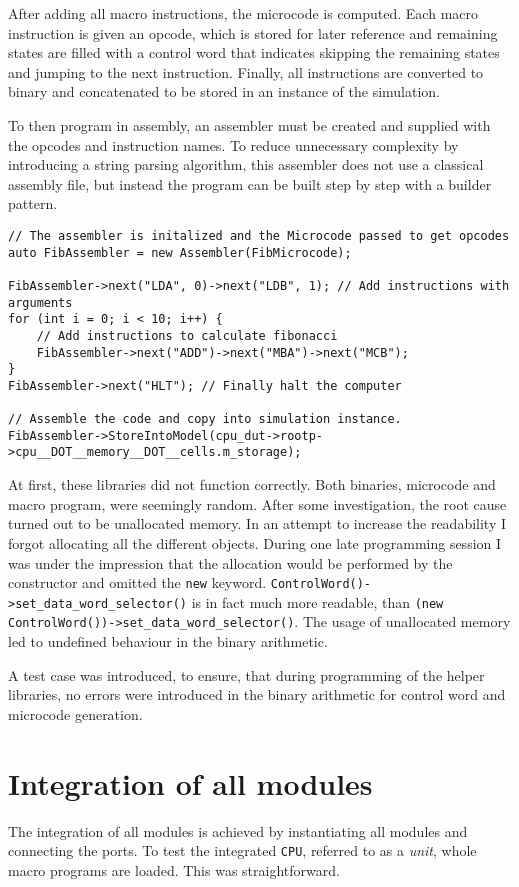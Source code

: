 After adding all macro instructions, the microcode is computed. Each macro instruction is given an opcode, which is stored for later reference and remaining states are filled with a control word that indicates skipping the remaining states and jumping to the next instruction. Finally, all instructions are converted to binary and concatenated to be stored in an instance of the simulation. 

To then program in assembly, an assembler must be created and supplied with the opcodes and instruction names. To reduce unnecessary complexity by introducing a string parsing algorithm, this assembler does not use a classical assembly file, but instead the program can be built step by step with a builder pattern. 

\begin{lstlisting}[caption=Inialization of Assembler and programming of macrocode ]
// The assembler is initalized and the Microcode passed to get opcodes
auto FibAssembler = new Assembler(FibMicrocode); 

FibAssembler->next("LDA", 0)->next("LDB", 1); // Add instructions with arguments
for (int i = 0; i < 10; i++) {
    // Add instructions to calculate fibonacci
    FibAssembler->next("ADD")->next("MBA")->next("MCB"); 
}
FibAssembler->next("HLT"); // Finally halt the computer

// Assemble the code and copy into simulation instance.
FibAssembler->StoreIntoModel(cpu_dut->rootp->cpu__DOT__memory__DOT__cells.m_storage); 
\end{lstlisting}

At first, these libraries did not function correctly. Both binaries, microcode and macro program, were seemingly random. After some investigation, the root cause turned out to be unallocated memory. In an attempt to increase the readability I forgot allocating all the different objects. During one late programming session I was under the impression that the allocation would be performed by the constructor and omitted the \texttt{new} keyword. \texttt{ControlWord()->set\_data\_word\_selector()} is in fact much more readable, than \texttt{(new ControlWord())->set\_data\_word\_selector()}. The usage of unallocated memory led to undefined behaviour in the binary arithmetic.

A test case was introduced, to ensure, that during programming of the helper libraries, no errors were introduced in the binary arithmetic for control word and microcode generation.

\section{Integration of all modules} \label{sec:integration}
The integration of all modules is achieved by instantiating all modules and connecting the ports. To test the integrated \texttt{CPU}, referred to as a \textit{unit}, whole macro programs are loaded. This was straightforward. 

